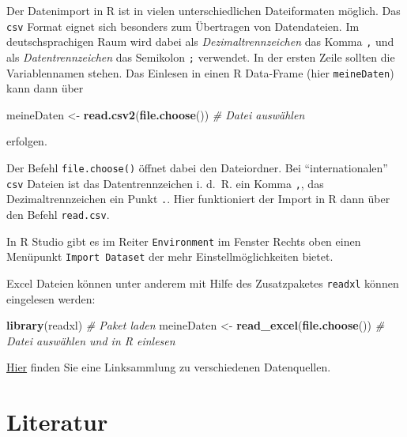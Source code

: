\documentclass[12pt,ngerman,paper=a4,pagesize,DIV=13]{scrreprt}
\newenvironment{Shaded}{\begin{snugshade}}{\end{snugshade}}
\newcommand{\CommentTok}[1]{\textcolor[rgb]{0.56,0.35,0.01}{\textit{#1}}}
\newcommand{\KeywordTok}[1]{\textcolor[rgb]{0.13,0.29,0.53}{\textbf{#1}}}
\newcommand{\NormalTok}[1]{#1}
\newcommand{\StringTok}[1]{\textcolor[rgb]{0.31,0.60,0.02}{#1}}
\begin{document}
Der Datenimport in R ist in vielen unterschiedlichen Dateiformaten
möglich. Das \texttt{csv} Format eignet sich besonders zum Übertragen
von Datendateien. Im deutschsprachigen Raum wird dabei als
\emph{Dezimaltrennzeichen} das Komma \texttt{,} und als
\emph{Datentrennzeichen} das Semikolon \texttt{;} verwendet. In der
ersten Zeile sollten die Variablennamen stehen. Das Einlesen in einen R
Data-Frame (hier \texttt{meineDaten}) kann dann über

\begin{Shaded}
\begin{Highlighting}[]
\NormalTok{meineDaten <-}\StringTok{ }\KeywordTok{read.csv2}\NormalTok{(}\KeywordTok{file.choose}\NormalTok{()) }\CommentTok{# Datei auswählen}
\end{Highlighting}
\end{Shaded}

erfolgen.

Der Befehl \texttt{file.choose()} öffnet dabei den Dateiordner. Bei
\enquote{internationalen} \texttt{csv} Dateien ist das Datentrennzeichen
i. d.~R. ein Komma \texttt{,}, das Dezimaltrennzeichen ein Punkt
\texttt{.}. Hier funktioniert der Import in R dann über den Befehl
\texttt{read.csv}.

In R Studio gibt es im Reiter \texttt{Environment} im Fenster Rechts
oben einen Menüpunkt \texttt{Import\ Dataset} der mehr
Einstellmöglichkeiten bietet.

Excel Dateien können unter anderem mit Hilfe des Zusatzpaketes
\texttt{readxl} können eingelesen werden:

\begin{Shaded}
\begin{Highlighting}[]
\KeywordTok{library}\NormalTok{(readxl) }\CommentTok{# Paket laden}
\NormalTok{meineDaten <-}\StringTok{ }\KeywordTok{read_excel}\NormalTok{(}\KeywordTok{file.choose}\NormalTok{())  }\CommentTok{# Datei auswählen und in R einlesen}
\end{Highlighting}
\end{Shaded}

\href{https://www.fom.de/forschung/institute/ifes/studium-und-lehre.html\#!acc=datenquellen}{Hier}
finden Sie eine Linksammlung zu verschiedenen Datenquellen.

\hypertarget{literatur}{%
\section{Literatur}\label{literatur}}
\end{document}
